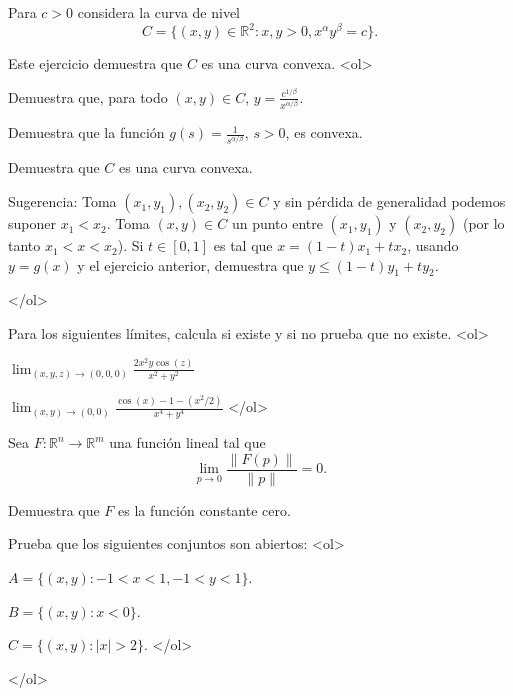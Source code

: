 \documentclass{article}
\theoremstyle{definition}
\begin{document}
	Para $c>0$ considera la curva de nivel
	$$
	C=\{ (x,y)\in \mathbb{R}^2: x, y > 0, x^\alpha y^\beta =c\}.
	$$
	
	
	
	
	Este ejercicio demuestra que $C$ es una curva convexa. 
	<ol>
	\item Demuestra que, para todo $(x,y)\in C$, $y=\frac{c^{1/\beta}}{x^{\alpha/\beta}}$.
	\item Demuestra que la función $g(s)=\frac{1}{s^{\alpha / \beta}}$, $s >0$, es convexa. 
	\item Demuestra  que $C$ es una curva convexa.
	
	Sugerencia: Toma $(x_1,y_1), (x_2,y_2)\in C$ y sin pérdida de generalidad podemos suponer $x_1<x_2$. Toma
	$(x,y)\in C$ un punto entre $(x_1,y_1)$ y $(x_2,y_2)$ (por lo tanto $x_1<x<x_2$). Si $t\in [0,1]$
	es tal que $x=(1-t)x_1+tx_2$, usando $y=g(x)$ y el ejercicio anterior, demuestra que  $y\leq (1-t)y_1+ty_2$.
	
	</ol>



      \item Para los siguientes límites, calcula si existe y si no prueba que no existe.
        <ol>
        \item $\lim_{(x,y,z)\to (0,0,0)} \frac{2x^2y\cos(z)}{x^2+y^2}$
          \item $\lim_{(x,y)\to (0,0)} \frac{\cos(x)-1-(x^2/2)}{x^4+y^4}$
        </ol>
    
  \item Sea $F:\mathbb{R}^n \to \mathbb{R}^m$ una función lineal tal que
    $$
    \lim_{p\to 0} \frac{\|F(p)\|}{\|p\|}=0.
    $$

    Demuestra que $F$ es la función constante cero.

  \item Prueba que los siguientes conjuntos son abiertos:
    <ol>
    \item $A=\{(x,y): -1< x <1, -1<y <1  \}$.
  \item $B=\{(x,y): x< 0  \}$.
    \item $C=\{ (x,y): |x|>2  \}$.
    </ol>
    


  </ol>
  
  
       
\end{document}
